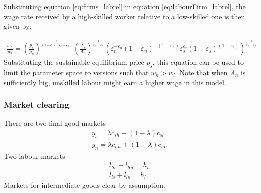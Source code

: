 Substituting equation  \ref{eq:firms_labrel}  in equation \ref{eq:labourFirm_labrel},
the wage rate received by a high-skilled worker relative to a low-skilled one is then given by:

\begin{align}
\frac{w_h}{w_l}=\left(\frac{p_s}{p_n}\right)^\frac{1}{(1-\alpha)(\varepsilon_s-\varepsilon_n)} \left(\frac{A_s}{A_n}\right)^\frac{1}{\varepsilon_s-\varepsilon_n}\left(\varepsilon_n^{-\varepsilon_n} (1-\varepsilon_n)^{-(1-\varepsilon_n)}\varepsilon_s^{\varepsilon_s} (1-\varepsilon_s)^{(1-\varepsilon_s)} \right)^\frac{1}{\varepsilon_s-\varepsilon_n}
\end{align}
Substituting the sustainable equilibrium price $p_s$, this equation can be used to limit the parameter space to versions such that $w_h>w_l$. Note that when $A_n$ is sufficiently big, unskilled labour might earn a higher wage in this model. %

\subsubsection{Market clearing}
There are two final good markets
\begin{align*}
y_s=\lambda c_{sh}+(1-\lambda) c_{sl}\\
y_n=\lambda c_{nh}+(1-\lambda) c_{nl}.
\end{align*}
Two labour markets
\begin{align*}
l_{hs}+l_{hn}=h_h\\
l_{ls}+l_{ln}=h_l.
\end{align*}
Markets for intermediate goods clear by assumption.

